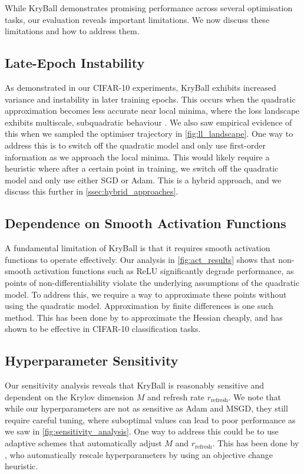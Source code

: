 While KryBall demonstrates promising performance across several optimisation tasks, our evaluation reveals important limitations. We now discuss these limitations and how to address them.

\subsection{Late-Epoch Instability}
\label{ssec:late_epoch_instability}

As demonstrated in our CIFAR-10 experiments, KryBall exhibits increased variance and instability in later training epochs. This occurs when the quadratic approximation becomes less accurate near local minima, where the loss landscape exhibits multiscale, subquadratic behaviour \citep{ma2022beyond}. We also saw empirical evidence of this when we sampled the optimiser trajectory in \cref{fig:ll_landscape}. One way to address this is to switch off the quadratic model and only use first-order information as we approach the local minima. This would likely require a heuristic where after a certain point in training, we switch off the quadratic model and only use either SGD or Adam. This is a hybrid approach, and we discuss this further in \cref{ssec:hybrid_approaches}.
    
\subsection{Dependence on Smooth Activation Functions}
\label{ssec:dependence_on_smooth_activation_functions}

A fundamental limitation of KryBall is that it requires smooth activation functions to operate effectively. Our analysis in \cref{fig:act_results} shows that non-smooth activation functions such as ReLU significantly degrade performance, as points of non-differentiability violate the underlying assumptions of the quadratic model. To address this, we require a way to approximate these points without using the quadratic model. Approximation by finite differences is one such method. This has been done by \cite{finite_diff} to approximate the Hessian cheaply, and has shown to be effective in CIFAR-10 classification tasks.

\subsection{Hyperparameter Sensitivity}
\label{ssec:hyperparameter_sensitivity}

Our sensitivity analysis reveals that KryBall is reasonably sensitive and dependent on the Krylov dimension $M$ and refresh rate $r_{\text{refresh}}$. We note that while our hyperparameters are not as sensitive as Adam and MSGD, they still require careful tuning, where suboptimal values can lead to poor performance as we saw in \cref{fig:sensitivity_analysis}. One way to address this could be to use adaptive schemes that automatically adjust $M$ and $r_{\text{refresh}}$. This has been done by \cite{henriques2019small}, who automatically rescale hyperparameters by using an objective change heuristic.

